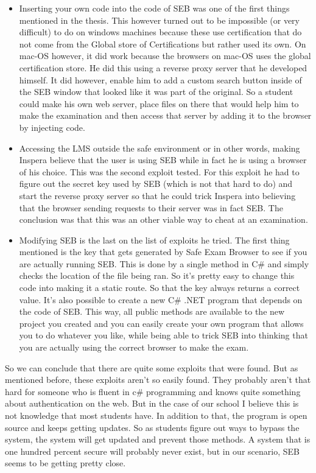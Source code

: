 \begin{itemize}
\item Inserting your own code into the code of SEB was one of the first things mentioned in the thesis. This however turned out to be impossible (or very difficult) to do on windows machines because these use certification that do not come from the Global store of Certifications  but rather used its own. On  mac-OS however, it did work because the browsers on mac-OS uses the global certification store. He did this using a reverse proxy server that he developed himself. It did however, enable him to add a custom search button inside of the SEB window that looked like it was part of the original. So a student could make his own web server, place files on there that would help him to make the examination and then access that server by adding it to the browser by injecting code.
\item Accessing the LMS outside the safe environment or in other words, making Inspera believe that the user is using SEB while in fact he is using a browser of his choice. This was the second exploit tested. For this exploit he had to figure out the secret key used by SEB (which is not that hard to do) and start the reverse proxy server so that he could trick Inspera into believing that the browser sending requests to their server was in fact SEB. The conclusion was that this was an other viable way to cheat at an examination.
\item Modifying SEB is the last on the list of exploits he tried. The first thing mentioned is the key that gets generated by Safe Exam Browser to see if you are actually running SEB. This is done by a single method in C\# and simply checks the location of the file being ran. So it's pretty easy to change this code into making it a static route. So that the key always returns a correct value. It's also possible to create a new C\# .NET program that depends on the code of SEB. This way, all public methods are available to the new project you created and you can easily create your own program that allows you to do whatever you like, while being able to trick SEB into thinking that you are actually using the correct browser to make the exam.
\end{itemize}

So we can conclude that there are quite some exploits that were found. But as mentioned before, these exploits aren't so easily found. They probably aren't that hard for someone who is fluent in c\# programming and knows quite something about authentication on the web. But in the case of our school I believe this is not knowledge that most students have. In addition to that, the program is open source and keeps getting updates. So as students figure out ways to bypass the system, the system will get updated and prevent those methods.
A system that is one hundred percent secure will probably never exist, but in our scenario, SEB seems to be getting pretty close.

